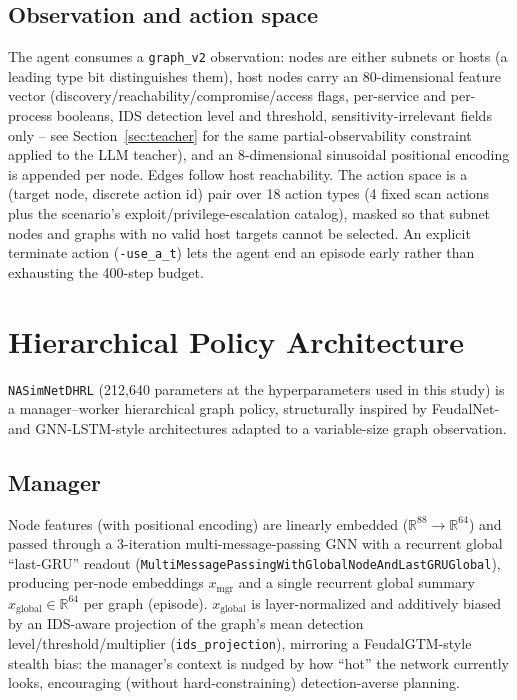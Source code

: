 \documentclass[11pt]{article}
\newcommand{\code}[1]{\texttt{#1}}
\begin{document}
\subsection{Observation and action space}
The agent consumes a \code{graph\_v2} observation: nodes are either subnets or hosts
(a leading type bit distinguishes them), host nodes carry an 80-dimensional feature
vector (discovery/reachability/compromise/access flags, per-service and per-process
booleans, IDS detection level and threshold, sensitivity-irrelevant fields only --
see Section~\ref{sec:teacher} for the same partial-observability constraint applied
to the LLM teacher), and an 8-dimensional sinusoidal positional encoding is appended
per node. Edges follow host reachability. The action space is a (target node,
discrete action id) pair over 18 action types (4 fixed scan actions plus the
scenario's exploit/privilege-escalation catalog), masked so that subnet nodes and
graphs with no valid host targets cannot be selected. An explicit terminate action
(\code{-use\_a\_t}) lets the agent end an episode early rather than exhausting the
400-step budget.

\section{Hierarchical Policy Architecture}
\label{sec:arch}

\code{NASimNetDHRL} (212{,}640 parameters at the hyperparameters used in this study)
is a manager--worker hierarchical graph policy, structurally inspired by FeudalNet-
and GNN-LSTM-style architectures adapted to a variable-size graph observation.

\subsection{Manager}
Node features (with positional encoding) are linearly embedded
($\mathbb{R}^{88}\!\to\!\mathbb{R}^{64}$) and passed through a 3-iteration
multi-message-passing GNN with a recurrent global ``last-GRU'' readout
(\code{Multi\-Message\-Passing\-With\-Global\-Node\-And\-Last\-GRU\-Global}), producing per-node
embeddings $x_{\text{mgr}}$ and a single recurrent global summary $x_{\text{global}}
\in \mathbb{R}^{64}$ per graph (episode). $x_{\text{global}}$ is layer-normalized and
additively biased by an IDS-aware projection of the graph's mean detection
level/threshold/multiplier (\code{ids\_projection}), mirroring a FeudalGTM-style
stealth bias: the manager's context is nudged by how ``hot'' the network currently
looks, encouraging (without hard-constraining) detection-averse planning.
\end{document}
